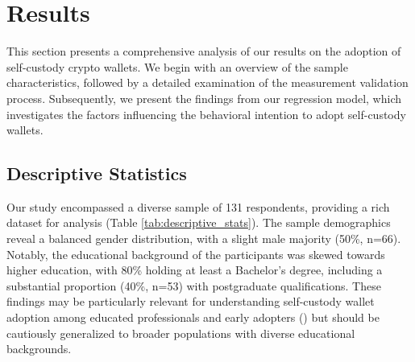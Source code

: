 \documentclass[twocolumn]{article}
\begin{document}
\section{Results}

This section presents a comprehensive analysis of our results on the adoption of self-custody crypto wallets. We begin with an overview of the sample characteristics, followed by a detailed examination of the measurement validation process. Subsequently, we present the findings from our regression model, which investigates the factors influencing the behavioral intention to adopt self-custody wallets.

\subsection{Descriptive Statistics}

Our study encompassed a diverse sample of 131 respondents, providing a rich dataset for analysis (Table \ref{tab:descriptive_stats}). The sample demographics reveal a balanced gender distribution, with a slight male majority (50\%, n=66). Notably, the educational background of the participants was skewed towards higher education, with 80\% holding at least a Bachelor's degree, including a substantial proportion (40\%, n=53) with postgraduate qualifications. These findings may be particularly relevant for understanding self-custody wallet adoption among educated professionals and early adopters (\cite{van_rijnsoever_effect_2009}) but should be cautiously generalized to broader populations with diverse educational backgrounds.
\end{document}
